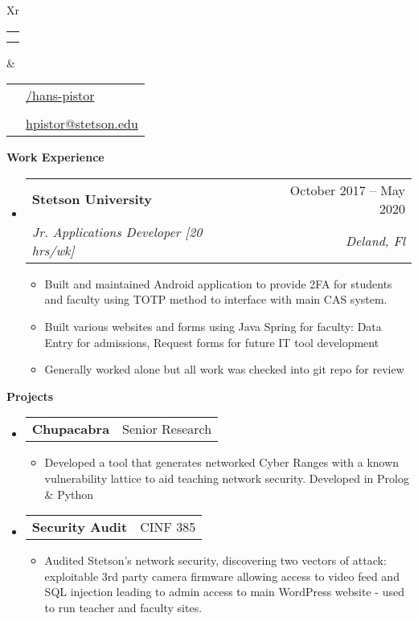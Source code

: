 \documentclass[letterpaper,12pt]{article}[leftmargin=*]
\makeatletter
\def \fullname {Hans Pistor}
\def \subtitle {}
\def \phoneicon {\faPhone}
\def \phonetext {+1-407-443-5855}
\def \emailicon {\faEnvelope}
\def \emaillink {mailto:hpistor@stetson.edu}
\def \emailtext {hpistor@stetson.edu}
\def \githubicon {\faGithub}
\def \githublink {https://github.com/hans-pistor}
\def \githubtext {/hans-pistor}
\def \headertype {\doublecol} %
\def \entryspacing {-0pt}
\def \phone {\phoneicon \hspace{3pt}{ \phonetext}}
\def \email {\emailicon \hspace{3pt}\href{\emaillink}{\emailtext}}
\def \github {\githubicon \hspace{3pt}\href{\githublink}{\githubtext}}
\renewcommand{\section}[2]{\vspace{5pt}
  \colorbox{secondary}{\color{white}\raggedbottom\normalsize\textbf{{#1}{\hspace{7pt}#2}}}
}
\newcommand{\resumeEntryStart}{\begin{itemize}[leftmargin=2.5mm]}
\newcommand{\resumeEntryEnd}{\end{itemize}\vspace{\entryspacing}}
\newcommand{\resumeItemListStart}{\begin{itemize}[leftmargin=4.5mm]}
\newcommand{\resumeItemListEnd}{\end{itemize}}
\newcommand{\resumeItem}[1]{
  \item\small{
    {#1 \vspace{-2pt}}
  }
}
\newcommand{\resumeEntryTSDL}[4]{
  \vspace{-1pt}\item[]
    \begin{tabularx}{0.97\textwidth}{X@{\hspace{60pt}}r}
      \textbf{\color{primary}#1} & {\firabook\color{accent}\small#2} \\
      \textit{\color{accent}\small#3} & \textit{\color{accent}\small#4} \\
    \end{tabularx}\vspace{-6pt}
}
\newcommand{\resumeEntryTD}[2]{
  \vspace{-1pt}\item[]
    \begin{tabularx}{0.97\textwidth}{X@{\hspace{60pt}}r}
      \textbf{\color{primary}#1} & {\firabook\color{accent}\small#2} \\
    \end{tabularx}\vspace{-6pt}
}
\newcommand{\doublecol}[6]{
  \begin{tabularx}{\textwidth}{Xr}
    {
      \begin{tabular}[c]{l}
        \fontsize{35}{45}\selectfont{\color{primary}{{\textbf{\fullname}}}} \\
        {\textit{\subtitle}} %
      \end{tabular}
    } & {
      \begin{tabular}[c]{l@{\hspace{1.5em}}l}
        {\small#4} & {\small#1} \\
        {\small#5} & {\small#2} \\
        {\small#6} & {\small#3}
      \end{tabular}
    }
  \end{tabularx}
}
\newcommand{\singlecol}[6]{
  \begin{tabularx}{\textwidth}{Xr}
    {
      \begin{tabular}[b]{l}
        \fontsize{35}{45}\selectfont{\color{primary}{{\textbf{\fullname}}}} \\
        {\textit{\subtitle}} %
      \end{tabular}
    } & {
      \begin{tabular}[c]{l}
        {\small#1} \\
        {\small#2} \\
        {\small#3} \\
        {\small#4} \\
        {\small#5} \\
        {\small#6}
      \end{tabular}
    }
  \end{tabularx}
}
\makeatother
\begin{document}


\headertype{\github}{\phone}{\email}{}{}{} %
\vspace{-10pt} %


\section{\faPieChart}{Work Experience}

  \resumeEntryStart
    \resumeEntryTSDL
      {Stetson University}{October 2017 -- May 2020}
      {Jr. Applications Developer [20 hrs/wk]}{Deland, Fl}
    \resumeItemListStart
      \resumeItem {Built and maintained Android application to provide 2FA for students and faculty using TOTP method to interface with main CAS system.}
      \resumeItem {Built various websites and forms using Java Spring for faculty: Data Entry for admissions, Request forms for future IT tool development}
      \resumeItem {Generally worked alone but all work was checked into git repo for review}
    \resumeItemListEnd
  \resumeEntryEnd



\section{\faFlask}{Projects}

  \resumeEntryStart
    \resumeEntryTD
      {Chupacabra}{Senior Research}
    \resumeItemListStart
      \resumeItem {Developed a tool that generates networked Cyber Ranges with a known vulnerability lattice to aid teaching network security. Developed in Prolog \& Python}
    \resumeItemListEnd
  \resumeEntryEnd

  \resumeEntryStart
    \resumeEntryTD
      {Security Audit}{CINF 385}
    \resumeItemListStart
    \resumeItem {Audited Stetson's network security, discovering two vectors of attack: exploitable 3rd party camera firmware allowing access to video feed and SQL injection leading to admin access to main WordPress website - used to run teacher and faculty sites.}
    \resumeItemListEnd
  \resumeEntryEnd
\end{document}

